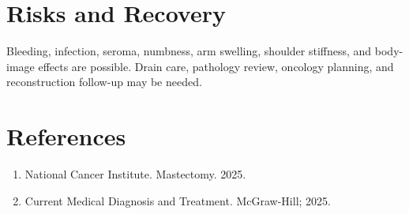 \section*{Risks and Recovery}
Bleeding, infection, seroma, numbness, arm swelling, shoulder stiffness, and body-image effects are possible. Drain care, pathology review, oncology planning, and reconstruction follow-up may be needed.
\section*{References}
\begin{enumerate}\item National Cancer Institute. Mastectomy. 2025.\item Current Medical Diagnosis and Treatment. McGraw-Hill; 2025.\end{enumerate}
\clearpage
